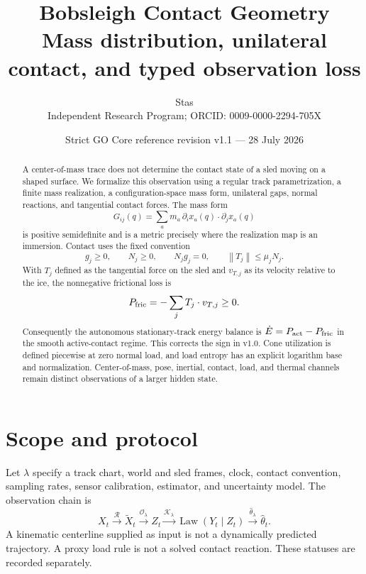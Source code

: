 \documentclass[11pt,a4paper]{article}
\title{\bfseries Bobsleigh Contact Geometry\\
\large Mass distribution, unilateral contact, and typed observation loss}
\author{Stas\\
\small Independent Research Program; ORCID: 0009-0000-2294-705X}
\date{Strict GO Core reference revision v1.1 --- 28 July 2026}
\theoremstyle{definition}
\theoremstyle{plain}
\theoremstyle{remark}
\newcommand{\norm}[1]{\left\lVert #1\right\rVert}
\newcommand{\Ocal}{\mathcal O}
\newcommand{\Kcal}{\mathcal K}
\newcommand{\Rcal}{\mathcal R}
\begin{document}
\maketitle

\begin{center}
\end{center}

\begin{abstract}
A center-of-mass trace does not determine the contact state of a sled
moving on a shaped surface. We formalize this observation using a
regular track parametrization, a finite mass realization, a
configuration-space mass form, unilateral gaps, normal reactions, and
tangential contact forces. The mass form
\[
G_{ij}(q)=\sum_a m_a\,\partial_i x_a(q)\cdot\partial_jx_a(q)
\]
is positive semidefinite and is a metric precisely where the
realization map is an immersion. Contact uses the fixed convention
\[
g_j\ge0,\qquad N_j\ge0,\qquad N_jg_j=0,\qquad
\norm{T_j}\le\mu_jN_j .
\]
With \(T_j\) defined as the tangential force on the sled and
\(v_{T,j}\) as its velocity relative to the ice, the nonnegative
frictional loss is
\[
P_{\rm fric}=-\sum_jT_j\cdot v_{T,j}\ge0.
\]
Consequently the autonomous stationary-track energy balance is
\(\dot E=P_{\rm act}-P_{\rm fric}\) in the smooth active-contact
regime. This corrects the sign in v1.0. Cone utilization is defined
piecewise at zero normal load, and load entropy has an explicit
logarithm base and normalization. Center-of-mass, pose, inertial,
contact, load, and thermal channels remain distinct observations of a
larger hidden state.
\end{abstract}

\tableofcontents

\section{Scope and protocol}

Let \(\lambda\) specify a track chart, world and sled frames, clock,
contact convention, sampling rates, sensor calibration, estimator, and
uncertainty model. The observation chain is
\[
X_t\xrightarrow{\Rcal}\widetilde X_t
\xrightarrow{\Ocal_\lambda}Z_t
\xrightarrow{\Kcal_\lambda}\operatorname{Law}(Y_t\mid Z_t)
\xrightarrow{\widehat\theta_\lambda}\widehat\theta_t.
\]
A kinematic centerline supplied as input is not a dynamically
predicted trajectory. A proxy load rule is not a solved contact
reaction. These statuses are recorded separately.
\end{document}
